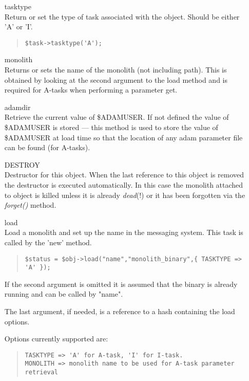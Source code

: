 \documentclass[twoside,11pt]{article}
\newenvironment{myquote}{\begin{quote}\begin{small}}{\end{small}\end{quote}}
\renewcommand{\_}{\texttt{\symbol{95}}}
\begin{document}
\begin{itemize}
\item[tasktype]%
%
\hfill\\
Return or set the type of task associated with the object.
Should be either 'A' or 'I'.
\begin{myquote}
\begin{verbatim}
$task->tasktype('A');
\end{verbatim}
\end{myquote}

\item[monolith]%
%
\hfill\\
Returns or sets the name of the monolith (not including path).
This is obtained by looking at the second argument to the
load method and is required for A-tasks when performing a parameter
get.

\item[adamdir]%
%
\hfill\\
Retrieve the current value of \$ADAM\_{}USER. If not defined the
value of \$ADAM\_{}USER is stored --- this method is used to store the
value of \$ADAM\_{}USER at load time so that the location of any
adam parameter file can be found (for A-tasks).

\item[DESTROY]%
%
\hfill\\
Destructor for this object. When the last reference to this
object is removed the destructor is executed automatically.
In this case the monolith attached to object is killed 
unless it is already {\em dead\/}(!) or it has been forgotten
via the {\em forget()\/} method.

\item[load]%
%
\hfill\\
Load a monolith and set up the name in the messaging system.
This task is called by the 'new' method.
\begin{myquote}
\begin{verbatim}
$status = $obj->load("name","monolith_binary",{ TASKTYPE => 'A' });
\end{verbatim}
\end{myquote}

If the second argument is omitted it is assumed that the binary
is already running and can be called by "name".   

The last argument, if needed, is a reference to a hash containing
the load options. 

Options currently supported are:
\begin{myquote}
\begin{verbatim}
TASKTYPE => 'A' for A-task, 'I' for I-task.
MONOLITH => monolith name to be used for A-task parameter retrieval
\end{verbatim}
\end{myquote}


\end{itemize}
\end{document}
